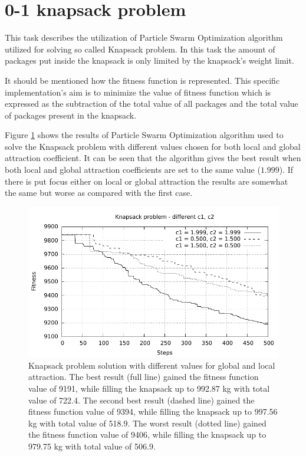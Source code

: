 \section{0-1 knapsack problem}
This task describes the utilization of Particle Swarm Optimization algorithm utilized for solving so called Knapsack problem. In this task the amount of packages put inside the knapsack is only limited by the knapsack's weight limit.

It should be mentioned how the fitness function is represented. This specific implementation's aim is to minimize the value of fitness function which is expressed as the subtraction of the total value of all packages and the total value of packages present in the knapsack.

Figure \ref{fig:knaspack} shows the results of Particle Swarm Optimization algorithm used to solve the Knapsack problem with different values chosen for both local and global attraction coefficient. It can be seen that the algorithm gives the best result when both local and global attraction coefficients are set to the same value ($1.999$). If there is put focus either on local or global attraction the results are somewhat the same but worse as compared with the first case.

\begin{figure}[!h]
	\centering
		\includegraphics[width=15cm]{img/3b.pdf}
	\caption{Knapsack problem solution with different values for global and local attraction. The best result (full line) gained the fitness function value of 9191, while filling the knapsack up to 992.87 kg with total value of 722.4. The second best result (dashed line) gained the fitness function value of 9394, while filling the knapsack up to 997.56 kg with total value of 518.9. The worst result (dotted line) gained the fitness function value of 9406, while filling the knapsack up to 979.75 kg with total value of 506.9.}
	\label{fig:knaspack}
\end{figure}

